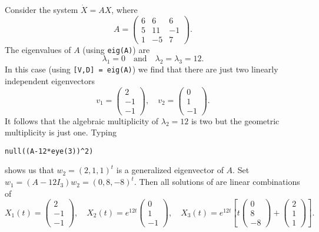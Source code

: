 Consider the system $\dot{X}=AX$, where 
\begin{equation*}    \label{eq:exsyslin2}
A =
\left(\begin{array}{rrr}
     6  &  6  &  6\\
     5  & 11  & -1\\
     1  & -5  &  7
\end{array}\right).
\end{equation*}
The eigenvalues of $A$ (using {\tt eig(A)}) are
\[
\lambda_1=0\quad \mbox{and}\quad \lambda_2=\lambda_3=12.
\]
In this case (using {\tt [V,D] = eig(A)}) we find that there are just two
linearly independent eigenvectors
\[
v_1=\left(\begin{array}{r}
2 \\ -1 \\ -1
\end{array}\right),\quad
v_2=\left(\begin{array}{r}
0 \\ 1 \\ -1
\end{array}\right).
\]
It follows that the algebraic multiplicity
of $\lambda_2=12$
is two but the geometric multiplicity
is just one.  Typing
\begin{verbatim}
null((A-12*eye(3))^2)
\end{verbatim}
shows us that $w_2=(2,1,1)^t$ is a generalized eigenvector of $A$.
Set $w_1=(A-12I_3)w_2=(0,8,-8)^t$.  Then all solutions of 
are linear combinations of
\[
X_1(t)=\left(\begin{array}{r}
2 \\ -1 \\ -1
\end{array}\right), \quad
X_2(t)=e^{12t}\left(\begin{array}{r}
0 \\ 1 \\ -1
\end{array}\right), \quad
X_3(t)=e^{12t}\left[
t\left(\begin{array}{r}
0 \\ 8 \\ -8
\end{array}\right)
+\left(\begin{array}{r}
2 \\ 1 \\ 1
\end{array}\right)\right].
\]



